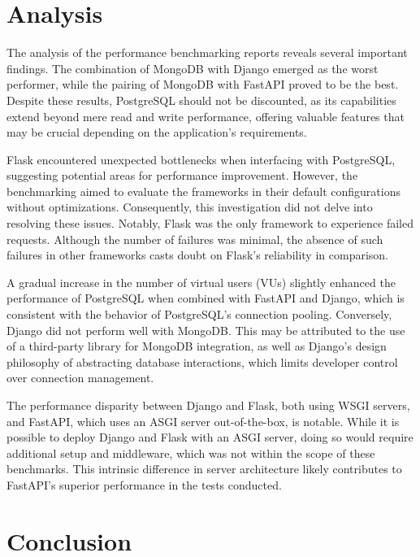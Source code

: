 \documentclass[12pt,onecolumn,a4paper,titlepage]{article}
\begin{document}
\pagebreak

\section{Analysis}

The analysis of the performance benchmarking reports reveals several important findings. The combination of MongoDB with Django emerged as the worst performer, while the pairing of MongoDB with FastAPI proved to be the best. Despite these results, PostgreSQL should not be discounted, as its capabilities extend beyond mere read and write performance, offering valuable features that may be crucial depending on the application's requirements.

Flask encountered unexpected bottlenecks when interfacing with PostgreSQL, suggesting potential areas for performance improvement. However, the benchmarking aimed to evaluate the frameworks in their default configurations without optimizations. Consequently, this investigation did not delve into resolving these issues. Notably, Flask was the only framework to experience failed requests. Although the number of failures was minimal, the absence of such failures in other frameworks casts doubt on Flask's reliability in comparison.

A gradual increase in the number of virtual users (VUs) slightly enhanced the performance of PostgreSQL when combined with FastAPI and Django, which is consistent with the behavior of PostgreSQL's connection pooling. Conversely, Django did not perform well with MongoDB. This may be attributed to the use of a third-party library for MongoDB integration, as well as Django's design philosophy of abstracting database interactions, which limits developer control over connection management.

The performance disparity between Django and Flask, both using WSGI servers, and FastAPI, which uses an ASGI server out-of-the-box, is notable. While it is possible to deploy Django and Flask with an ASGI server, doing so would require additional setup and middleware, which was not within the scope of these benchmarks. This intrinsic difference in server architecture likely contributes to FastAPI's superior performance in the tests conducted.

\pagebreak

\section{Conclusion}
\end{document}
